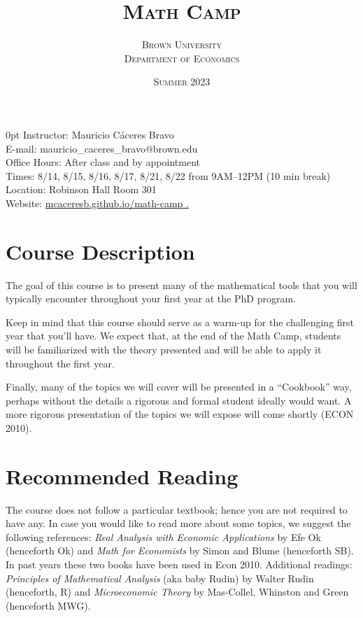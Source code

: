 \documentclass[11pt]{article}
\title{\bfseries\scshape Math Camp}
\author{\scshape Brown University \\ \scshape Department of Economics}
\date{\scshape Summer 2023}
\renewcommand{\displayoptions}{\maketitle\pagenumbering{arabic}}
\begin{document}
\displayoptions

{
  \bfseries
  \begin{adjustwidth}{\parindent}{0pt}
    Instructor: Mauricio C\'aceres Bravo \\
    E-mail: mauricio\_caceres\_bravo@brown.edu \\
    Office Hours: After class and by appointment \\[12pt]
    Times: 8/14, 8/15, 8/16, 8/17, 8/21, 8/22 from 9AM--12PM (10 min break) \\
    Location: Robinson Hall Room 301 \\
    Website: \href{https://mcaceresb.github.io/math-camp}{mcaceresb.github.io/math-camp \ExternalLink.}
  \end{adjustwidth}
  \vspace{12pt}
}

\section{Course Description}
\label{sec:course_description}

The goal of this course is to present many of the mathematical tools that you will typically encounter throughout your first year at the PhD program.

Keep in mind that this course should serve as a warm-up for the challenging first year that you’ll have. We expect that, at the end of the Math Camp, students will be familiarized with the theory presented and will be able to apply it throughout the first year.

Finally, many of the topics we will cover will be presented in a ``Cookbook'' way, perhaps without the details a rigorous and formal student ideally would want. A more rigorous presentation of the topics we will expose will come shortly (ECON 2010).

\section{Recommended Reading}
\label{sec:recommended_reading}

The course does not follow a particular textbook; hence you are not required to have any. In case you would like to read more about some topics, we suggest the following references: \textit{Real Analysis with Economic Applications} by Efe Ok (henceforth Ok) and \textit{Math for Economists} by Simon and Blume (henceforth SB). In past years these two books have been used in Econ 2010. Additional readings: \textit{Principles of Mathematical Analysis} (aka baby Rudin) by Walter Rudin (henceforth, R) and \textit{Microeconomic Theory} by Mas-Collel, Whinston and Green (henceforth MWG).
\end{document}
